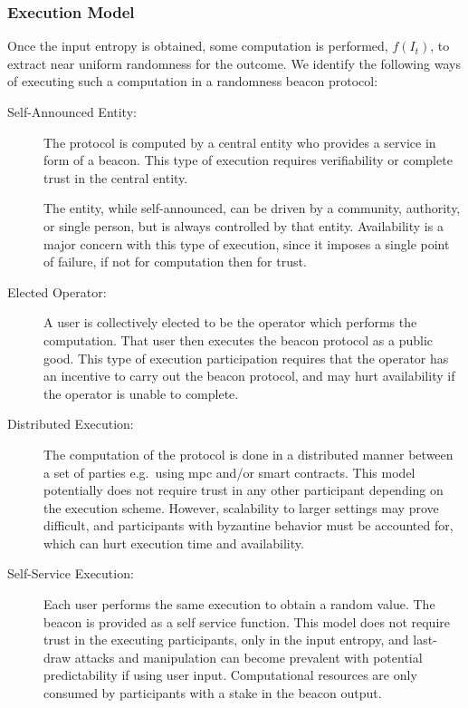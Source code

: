 \subsubsection{Execution Model}
Once the input entropy is obtained, some computation is performed, $f(I_t)$, to extract near uniform randomness for the outcome.
We identify the following ways of executing such a computation in a randomness beacon protocol:

\begin{description}
    \item[Self-Announced Entity:]
        The protocol is computed by a central entity who provides a service in form of a beacon.
        This type of execution requires verifiability or complete trust in the central entity.

        The entity, while self-announced, can be driven by a community, authority, or single person, but is always controlled by that entity.
        Availability is a major concern with this type of execution, since it imposes a single point of failure, if not for computation then for trust.

    \item[Elected Operator:]
        A user is collectively elected to be the operator which performs the computation.
        That user then executes the beacon protocol as a public good.
        This type of execution participation requires that the operator has an incentive to carry out the beacon protocol, and may hurt availability if the operator is unable to complete.

    \item[Distributed Execution:]
        The computation of the protocol is done in a distributed manner between a set of parties e.g.\ using \gls{mpc} and/or smart contracts.
        This model potentially does not require trust in any other participant depending on the execution scheme.
        However, scalability to larger settings may prove difficult, and participants with byzantine behavior must be accounted for, which can hurt execution time and availability.

    \item[Self-Service Execution:]
        Each user performs the same execution to obtain a random value. The beacon is provided as a self service function.
        This model does not require trust in the executing participants, only in the input entropy, and last-draw attacks and manipulation can become prevalent with potential predictability if using user input.
        Computational resources are only consumed by participants with a stake in the beacon output.
\end{description}

